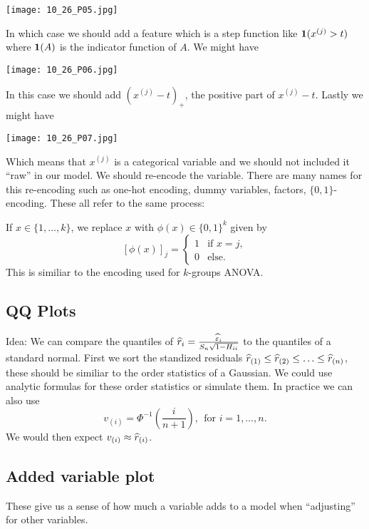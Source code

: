 \begin{center}
    \texttt{[image: 10\_26\_P05.jpg]}
\end{center}

In which case we should add a feature which is a step function like ${{\bf 1}}(x^{(j)}>t)$ where ${{\bf 1}}(A)$ is the indicator function of $A$. We might have

\begin{center}
    \texttt{[image: 10\_26\_P06.jpg]}
\end{center}

In this case we should add $(x^{(j)}-t)_+$, the positive part of $x^{(j)}-t$. Lastly we might have

\begin{center}
    \texttt{[image: 10\_26\_P07.jpg]}
\end{center}

Which means that $x^{(j)}$ is a categorical variable and we should not included it ``raw'' in our model. We should re-encode the variable. There are many names for this re-encoding such as one-hot encoding, dummy variables, factors, $\{0,1\}$-encoding. These all refer to the same process:

If $x \in \{1,\ldots,k\}$, we replace $x$ with $\phi(x)\in \{0,1\}^k$ given by 
\[[\phi(x)]_j = \begin{cases}
    1 & \text{if } x=j,\\
    0&\text{else.}
\end{cases} \]
This is similiar to the encoding used for $k$-groups ANOVA.

\subsection{QQ Plots}
Idea: We can compare the quantiles of $\widehat{r}_i = \frac{\widehat{\varepsilon}_i}{S_n\sqrt{1-H_{ii}}}$ to the quantiles of a standard normal. First we sort the standized residuals $\widehat{r}_{(1)} \le \widehat{r}_{(2)} \le \ldots \le \widehat{r}_{(n)}$, these should be similiar to the order statistics of a Gaussian. We could use analytic formulas for these order statistics or simulate them. In practice we can also use 
\[v_{(i)}=\Phi^{-1}\left(\frac{i}{n+1}\right), ~~\text{for } i = 1,\ldots,n. \]
We would then expect $v_{(i)} \approx \widehat{r}_{(i)}$.

\subsection{Added variable plot}
These give us a sense of how much a variable adds to a model when ``adjusting'' for other variables.


